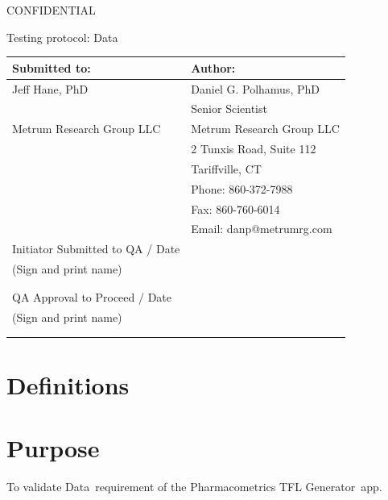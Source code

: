 \documentclass{article}
\newcommand{\tfl}{Pharmacometrics TFL Generator}
\newcommand{\topic}{Data}
\begin{document}
\begin{center}
{\large CONFIDENTIAL} 


\vspace*{1cm}


\vspace*{1cm}

{\huge Testing protocol: \topic}
\vspace{3.0cm}

\begin{tabular}{|l|l|}\hline
Submitted to: & Author:\\\hline
Jeff Hane, PhD & Daniel G. Polhamus, PhD \\
&Senior Scientist\\
Metrum Research Group LLC & Metrum Research Group LLC\\
 & 2 Tunxis Road, Suite 112\\
  & Tariffville, CT\\
  & Phone: 860-372-7988 \\
 & Fax: 860-760-6014 \\
  & Email: danp@metrumrg.com \\\hline

  Initiator Submitted to QA  / Date & \\
  
 (Sign and print name) & \\
  & \\
  & \\\hline
  
QA Approval to Proceed / Date & \\

 (Sign and print name) & \\
  & \\
 & \\\hline

\end{tabular}

\end{center}

\newpage
\vspace{3in}
\section*{Definitions}


\section*{Purpose}
To validate \topic\ requirement of the \tfl\ app.
\end{document}
